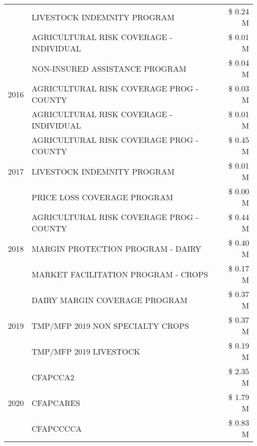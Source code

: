 \begin{tabular}{llr}
 & LIVESTOCK INDEMNITY PROGRAM & \$ 0.24 M \\
 & AGRICULTURAL RISK COVERAGE - INDIVIDUAL & \$ 0.01 M \\
\cline{1-3}
\multirow[t]{3}{*}{2016} & NON-INSURED ASSISTANCE PROGRAM & \$ 0.04 M \\
 & AGRICULTURAL RISK COVERAGE PROG - COUNTY & \$ 0.03 M \\
 & AGRICULTURAL RISK COVERAGE - INDIVIDUAL & \$ 0.01 M \\
\cline{1-3}
\multirow[t]{3}{*}{2017} & AGRICULTURAL RISK COVERAGE PROG - COUNTY & \$ 0.45 M \\
 & LIVESTOCK INDEMNITY PROGRAM & \$ 0.01 M \\
 & PRICE LOSS COVERAGE PROGRAM & \$ 0.00 M \\
\cline{1-3}
\multirow[t]{3}{*}{2018} & AGRICULTURAL RISK COVERAGE PROG - COUNTY & \$ 0.44 M \\
 & MARGIN PROTECTION PROGRAM - DAIRY & \$ 0.40 M \\
 & MARKET FACILITATION PROGRAM - CROPS & \$ 0.17 M \\
\cline{1-3}
\multirow[t]{3}{*}{2019} & DAIRY MARGIN COVERAGE PROGRAM & \$ 0.37 M \\
 & TMP/MFP 2019 NON SPECIALTY CROPS & \$ 0.37 M \\
 & TMP/MFP 2019 LIVESTOCK & \$ 0.19 M \\
\cline{1-3}
\multirow[t]{3}{*}{2020} & CFAPCCA2 & \$ 2.35 M \\
 & CFAPCARES & \$ 1.79 M \\
 & CFAPCCCCA & \$ 0.83 M \\
\cline{1-3}
\bottomrule
\end{tabular}
